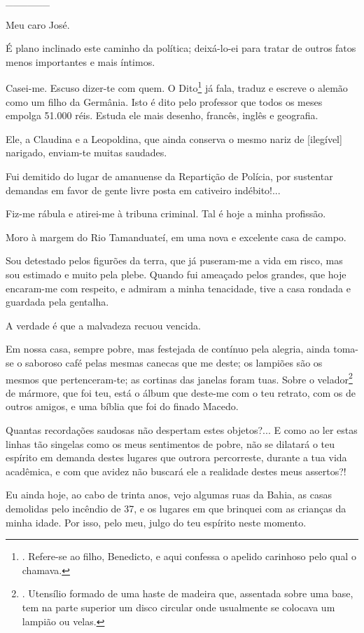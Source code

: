 \_\_\_\_\_\_

Meu caro José.

É plano inclinado este caminho da política; deixá-lo-ei para tratar de
outros fatos menos importantes e mais íntimos.

Casei-me. Escuso dizer-te com quem. O {Dito}\footnote{. Refere-se ao
  filho, Benedicto, e aqui confessa o apelido carinhoso pelo qual o
  chamava.} já fala, traduz e escreve o alemão como um filho da
Germânia. Isto é dito pelo professor que todos os meses empolga 51.000
réis. Estuda ele mais desenho, francês, inglês e geografia.

Ele, a Claudina e a Leopoldina, que ainda conserva o mesmo nariz de
{[}ilegível{]} narigado, enviam-te muitas saudades.

Fui demitido do lugar de amanuense da Repartição de Polícia, por
sustentar demandas em favor de gente livre posta em cativeiro
indébito!...

Fiz-me rábula e atirei-me à tribuna criminal. Tal é hoje a minha
profissão.

Moro à margem do Rio Tamanduateí, em uma nova e excelente casa de campo.

Sou detestado pelos figurões da terra, que já puseram-me a vida em
risco, mas sou estimado e muito pela plebe. Quando fui ameaçado pelos
grandes, que hoje encaram-me com respeito, e admiram a minha tenacidade,
tive a casa rondada e guardada pela gentalha.

A verdade é que a malvadeza recuou vencida.

Em nossa casa, sempre pobre, mas festejada de contínuo pela alegria,
ainda toma-se o saboroso café pelas mesmas canecas que me deste; os
lampiões são os mesmos que pertenceram-te; as cortinas das janelas foram
tuas. Sobre o velador\footnote{. Utensílio formado de uma haste de
  madeira que, assentada sobre uma base, tem na parte superior um disco
  circular onde usualmente se colocava um lampião ou velas.} de mármore,
que foi teu, está o álbum que deste-me com o teu retrato, com os de
outros amigos, e uma bíblia que foi do finado Macedo.

Quantas recordações saudosas não despertam estes objetos?... E como ao
ler estas linhas tão singelas como os meus sentimentos de pobre, não se
dilatará o teu espírito em demanda destes lugares que outrora
percorreste, durante a tua vida acadêmica, e com que avidez não buscará
ele a realidade destes meus assertos?!

Eu ainda hoje, ao cabo de trinta anos, vejo algumas ruas da Bahia, as
casas demolidas pelo incêndio de 37, e os lugares em que brinquei com as
crianças da minha idade. Por isso, pelo meu, julgo do teu espírito neste
momento.


